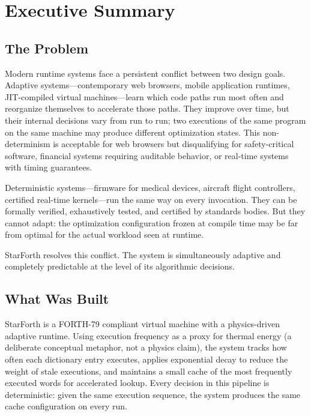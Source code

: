 
\section{Executive Summary}

\subsection{The Problem}

Modern runtime systems face a persistent conflict between two design goals.
Adaptive systems---contemporary web browsers, mobile application runtimes,
JIT-compiled virtual machines---learn which code paths run most often and
reorganize themselves to accelerate those paths. They improve over time, but
their internal decisions vary from run to run; two executions of the same
program on the same machine may produce different optimization states. This
non-determinism is acceptable for web browsers but disqualifying for
safety-critical software, financial systems requiring auditable behavior, or
real-time systems with timing guarantees.

Deterministic systems---firmware for medical devices, aircraft flight
controllers, certified real-time kernels---run the same way on every
invocation. They can be formally verified, exhaustively tested, and
certified by standards bodies. But they cannot adapt: the optimization
configuration frozen at compile time may be far from optimal for the actual
workload seen at runtime.

StarForth resolves this conflict. The system is simultaneously adaptive
and completely predictable at the level of its algorithmic decisions.

\subsection{What Was Built}

StarForth is a FORTH-79 compliant virtual machine with a physics-driven
adaptive runtime. Using execution frequency as a proxy for thermal energy
(a deliberate conceptual metaphor, not a physics claim), the system tracks
how often each dictionary entry executes, applies exponential decay to reduce
the weight of stale executions, and maintains a small cache of the most
frequently executed words for accelerated lookup. Every decision in this
pipeline is deterministic: given the same execution sequence, the system
produces the same cache configuration on every run.


